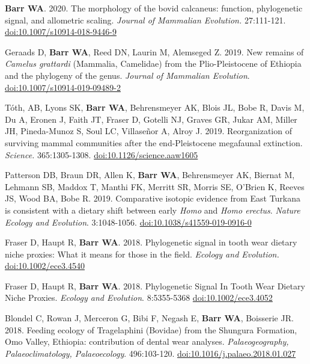\item {\bfseries Barr WA}. 2020. The morphology of the bovid calcaneus: function, phylogenetic signal, and allometric scaling. \emph{Journal of Mammalian Evolution.}  27:111-121. \href{https://dx.doi.org/10.1007/s10914-018-9446-9}{doi:10.1007/s10914-018-9446-9}

\item Geraads D, {\bfseries Barr WA}, Reed DN, Laurin M, Alemseged Z. 2019. New remains of \emph{Camelus grattardi} (Mammalia, Camelidae) from the Plio-Pleistocene of Ethiopia and the phylogeny of the genus. \emph{Journal of Mammalian Evolution}. \href{https://doi.org/10.1007/s10914-019-09489-2}{doi:10.1007/s10914-019-09489-2}

\item Tóth, AB, Lyons SK, {\bfseries Barr WA}, Behrensmeyer AK, Blois JL, Bobe R, Davis M, Du A, Eronen J, Faith JT, Fraser D, Gotelli NJ, Graves GR, Jukar AM, Miller JH, Pineda-Munoz S, Soul LC, Villaseñor A, Alroy J. 2019. Reorganization of surviving mammal communities after the end-Pleistocene megafaunal extinction. \emph{Science.} 365:1305-1308. \href{https://dx.doi.org/10.1126/science.aaw1605 }{doi:10.1126/science.aaw1605}

\item Patterson DB, Braun DR, Allen K, {\bfseries Barr WA}, Behrensmeyer AK, Biernat M, Lehmann SB, Maddox T, Manthi FK, Merritt SR, Morris SE, O'Brien K, Reeves JS, Wood BA, Bobe R. 2019. Comparative isotopic evidence from East Turkana is consistent with a dietary shift between early \emph{Homo} and \emph{Homo erectus}. \emph{Nature Ecology and Evolution}. 3:1048-1056. \href{https://dx.doi.org/10.1038/s41559-019-0916-0}{doi:10.1038/s41559-019-0916-0}


\item Fraser D, Haupt R,  {\bfseries Barr WA}. 2018. Phylogenetic signal in tooth wear dietary niche proxies: What it means for those in the field. \emph{Ecology and Evolution.} \href{https://dx.doi.org/10.1002/ece3.4540}{doi:10.1002/ece3.4540}


\item  Fraser D, Haupt R,  {\bfseries Barr WA}. 2018. Phylogenetic Signal In Tooth Wear Dietary Niche Proxies. \emph{Ecology and Evolution}. 8:5355-5368 \href{https://doi.org/10.1002/ece3.4052}{doi:10.1002/ece3.4052}

\item  Blondel C, Rowan J, Merceron G, Bibi F,  Negash E, {\bfseries Barr WA}, Boisserie JR. 2018. Feeding ecology of Tragelaphini (Bovidae) from the Shungura Formation, Omo Valley, Ethiopia: contribution of dental wear analyses.  \emph{Palaeogeography, Palaeoclimatology, Palaeoecology}. 496:103-120. \href{https://doi.org/10.1016/j.palaeo.2018.01.027}{doi:10.1016/j.palaeo.2018.01.027}

